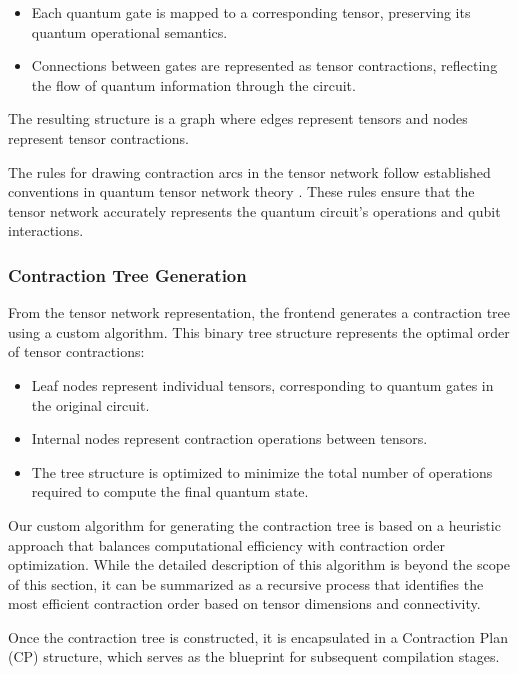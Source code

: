 \documentclass[12pt,oneside,a4paper]{article}
\begin{document}
\begin{itemize}
    \item Each quantum gate is mapped to a corresponding tensor, preserving its quantum operational semantics.
    \item Connections between gates are represented as tensor contractions, reflecting the flow of quantum information through the circuit.
\end{itemize}

The resulting structure is a graph where edges represent tensors and nodes represent tensor contractions.

The rules for drawing contraction arcs in the tensor network follow established conventions in quantum tensor network theory \cite{biamonte2017tensornetworksnutshell}. These rules ensure that the tensor network accurately represents the quantum circuit's operations and qubit interactions.

\subsubsection{Contraction Tree Generation}

From the tensor network representation, the frontend generates a contraction tree using a custom algorithm. This binary tree structure represents the optimal order of tensor contractions:

\begin{itemize}
    \item Leaf nodes represent individual tensors, corresponding to quantum gates in the original circuit.
    \item Internal nodes represent contraction operations between tensors.
    \item The tree structure is optimized to minimize the total number of operations required to compute the final quantum state.
\end{itemize}

Our custom algorithm for generating the contraction tree is based on a heuristic approach that balances computational efficiency with contraction order optimization. While the detailed description of this algorithm is beyond the scope of this section, it can be summarized as a recursive process that identifies the most efficient contraction order based on tensor dimensions and connectivity.

Once the contraction tree is constructed, it is encapsulated in a Contraction Plan (CP) structure, which serves as the blueprint for subsequent compilation stages.
\end{document}
